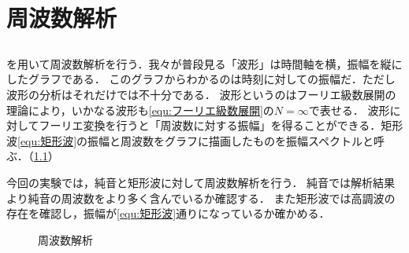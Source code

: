 \chapter{周波数解析}
\section{\kadaiba}\label{sec:\kadaiba}
\purpose
\matlab を用いて周波数解析を行う．我々が普段見る「波形」は時間軸を横，振幅を縦にしたグラフである．
このグラフからわかるのは時刻に対しての振幅だ．ただし波形の分析はそれだけでは不十分である．
波形というのはフーリエ級数展開の理論により，いかなる波形も\eqref{equ:フーリエ級数展開}の\(N=\infty\)で表せる．
波形に対してフーリエ変換を行うと「周波数に対する振幅」を得ることができる．矩形波\eqref{equ:矩形波}の振幅と周波数をグラフに描画したものを振幅スペクトルと呼ぶ．（\ref{fig:周波数解析}）\par
今回の実験では，純音と矩形波に対して周波数解析を行う．
純音では解析結果より純音の周波数をより多く含んでいるか確認する．
また矩形波では高調波の存在を確認し，振幅が\eqref{equ:矩形波}通りになっているか確かめる．
\begin{figure}[H]
    \centering
    
    \caption{周波数解析}
    \label{fig:周波数解析}
\end{figure}
\method
